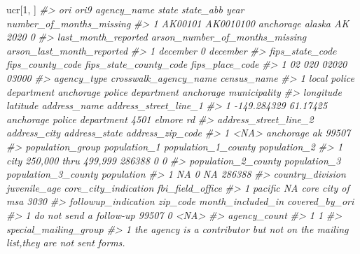 \documentclass[
]{krantz}
\makeatletter
\newenvironment{Shaded}{\begin{snugshade}}{\end{snugshade}}
\newcommand{\CommentTok}[1]{\textcolor[rgb]{0.37,0.37,0.37}{\textit{#1}}}
\newcommand{\DecValTok}[1]{\textcolor[rgb]{0.06,0.06,0.06}{#1}}
\newcommand{\NormalTok}[1]{#1}
\newenvironment{kframe}{%
\medskip{}
\setlength{\fboxsep}{.8em}
 \def\at@end@of@kframe{}%
 \ifinner\ifhmode%
  \def\at@end@of@kframe{\end{minipage}}%
  \begin{minipage}{\columnwidth}%
 \fi\fi%
 \def\FrameCommand##1{\hskip\@totalleftmargin \hskip-\fboxsep
 \colorbox{shadecolor}{##1}\hskip-\fboxsep
     \hskip-\linewidth \hskip-\@totalleftmargin \hskip\columnwidth}%
 \MakeFramed {\advance\hsize-\width
   \@totalleftmargin\z@ \linewidth\hsize
   \@setminipage}}%
 {\par\unskip\endMakeFramed%
 \at@end@of@kframe}
\renewenvironment{Shaded}{\begin{kframe}}{\end{kframe}}
\makeatother
\begin{document}
\begin{Shaded}
\begin{Highlighting}[]
\NormalTok{ucr[}\DecValTok{1}\NormalTok{, ]}
\CommentTok{\#\textgreater{}       ori      ori9 agency\_name  state state\_abb year number\_of\_months\_missing}
\CommentTok{\#\textgreater{} 1 AK00101 AK0010100   anchorage alaska        AK 2020                        0}
\CommentTok{\#\textgreater{}   last\_month\_reported arson\_number\_of\_months\_missing arson\_last\_month\_reported}
\CommentTok{\#\textgreater{} 1            december                              0                  december}
\CommentTok{\#\textgreater{}   fips\_state\_code fips\_county\_code fips\_state\_county\_code fips\_place\_code}
\CommentTok{\#\textgreater{} 1              02              020                  02020           03000}
\CommentTok{\#\textgreater{}               agency\_type       crosswalk\_agency\_name            census\_name}
\CommentTok{\#\textgreater{} 1 local police department anchorage police department anchorage municipality}
\CommentTok{\#\textgreater{}     longitude latitude                address\_name address\_street\_line\_1}
\CommentTok{\#\textgreater{} 1 {-}149.284329 61.17425 anchorage police department        4501 elmore rd}
\CommentTok{\#\textgreater{}   address\_street\_line\_2 address\_city address\_state address\_zip\_code}
\CommentTok{\#\textgreater{} 1                  \textless{}NA\textgreater{}    anchorage            ak            99507}
\CommentTok{\#\textgreater{}            population\_group population\_1 population\_1\_county population\_2}
\CommentTok{\#\textgreater{} 1 city 250,000 thru 499,999       286388                   0            0}
\CommentTok{\#\textgreater{}   population\_2\_county population\_3 population\_3\_county population}
\CommentTok{\#\textgreater{} 1                  NA            0                  NA     286388}
\CommentTok{\#\textgreater{}   country\_division juvenile\_age core\_city\_indication fbi\_field\_office}
\CommentTok{\#\textgreater{} 1          pacific           NA     core city of msa             3030}
\CommentTok{\#\textgreater{}       followup\_indication zip\_code month\_included\_in covered\_by\_ori}
\CommentTok{\#\textgreater{} 1 do not send a follow{-}up    99507                 0           \textless{}NA\textgreater{}}
\CommentTok{\#\textgreater{}   agency\_count}
\CommentTok{\#\textgreater{} 1            1}
\CommentTok{\#\textgreater{}                                                              special\_mailing\_group}
\CommentTok{\#\textgreater{} 1 the agency is a contributor but not on the mailing list,they are not sent forms.}

\end{Highlighting}
\end{Shaded}
\end{document}
